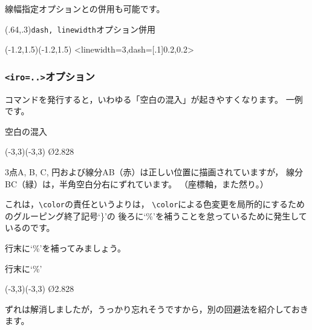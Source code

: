 \documentclass[a4j]{jarticle}
\begin{document}
線幅指定オプションとの併用も可能です。

\begin{showEx}(.64,.3){\texttt{dash, linewidth}オプション併用}
\begin{pszahyou}[ul=10mm](-1.2,1.5)(-1.2,1.5)
  \Drawline{\A\B}
  \Drawline<linewidth=3,dash=[.1]{0.2,0.2}>{\B\C}
  \Drawline{\C\D}
\end{pszahyou}
\end{showEx}

\subsubsection{\texttt{<iro=..>}オプション}
\bgroup
\def\byouga{%
  \def\Fx{X*X/2}
  \def\ASTx{2*cos(T)**3}
  \def\ASTy{2*sin(T)**3}
  \tenretu{A(-2,-2)s;B(2,2)n;C(-2,2)n}
  \YGurafu*[iro=cyan]\Fx
  \BGurafu[iro=magenta]\ASTx\ASTy{0}{2*$pi}
  \Put\O{\Daenko<iro=yellow>{2.5}{1.5}{-90}{90}}
  \En<iro=skyblue>\O{2}
  \Drawline<iro=red>{\A\B}
  \Drawline<iro=blue>{\B\C}
  \Drawline<iro=green>{\C\A}
}
コマンドを発行すると，いわゆる「空白の混入」が起きやすくなります。
一例です。

\begin{showEx}{空白の混入}
\begin{zahyou}[ul=8mm]%
    (-3,3)(-3,3)
\kuromaru{\A;\B;\C}
\En\O{2.828}
{\color{red}\Drawline{\A\B}}
{\color{green}\Drawline{\B\C}}
\end{zahyou}
\end{showEx}

3点A, B, C, 円および線分AB（赤）は正しい位置に描画されていますが，
線分BC（緑）は，半角空白分右にずれています。
（座標軸，また然り。）

これは，\verb+\color+の責任というよりは，
\verb+\color+による色変更を局所的にするためのグルーピング終了記号`\}'の
後ろに`\%'を補うことを怠っているために発生しているのです。

行末に`\%'を補ってみましょう。

\begin{showEx}{行末に`\%'}
\begin{zahyou}[ul=8mm]%
    (-3,3)(-3,3)
\kuromaru{\A;\B;\C}
\En\O{2.828}
{\color{red}\Drawline{\A\B}}%
{\color{green}\Drawline{\B\C}}%
\end{zahyou}
\end{showEx}

ずれは解消しましたが，うっかり忘れそうですから，別の回避法を紹介しておきます。
\end{document}
